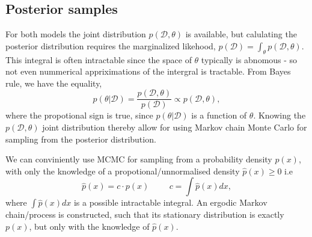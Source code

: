 \subsection*{Posterior samples}
For both models 
the joint distribution $p(\mathcal{D},\theta)$ is available, but calulating the posterior distribution requires the
marginalized likehood, $p(\mathcal{D}) = \int_{\theta} p(\mathcal{D},\theta)$. This integral is often intractable
since the space of $\theta$ typically is abnomous - so not even nummerical appriximations of the intergral is tractable.
From Bayes rule, we have the equality, 
$$p(\theta|\mathcal{D}) = \frac{p(\mathcal{D},\theta)}{p(\mathcal{D})} \propto p(\mathcal{D},\theta),$$
where the propotional sign is true, since $p(\theta|\mathcal{D})$ is a function of $\theta$. 
Knowing the $p(\mathcal{D},\theta)$ joint distribution thereby allow for using Markov chain Monte Carlo
for sampling from the posterior distribution.  

\begin{testexample2}
    We can conviniently use MCMC for sampling from a probability density $p(x)$, with only the knowledge of a 
    propotional/unnormalised density $\hat p(x) \geq 0$ i.e
    $$\hat p(x) = c\cdot p(x) \hspace{1cm} c = \int \hat p(x) dx,$$
    where $\int \hat p(x) dx$ is a possible intractable integral. 
    An ergodic Markov chain/process is constructed, such that its stationary distribution is exactly $p(x)$, but only
    with the knowledge of $\hat p(x)$. 
\end{testexample2}

